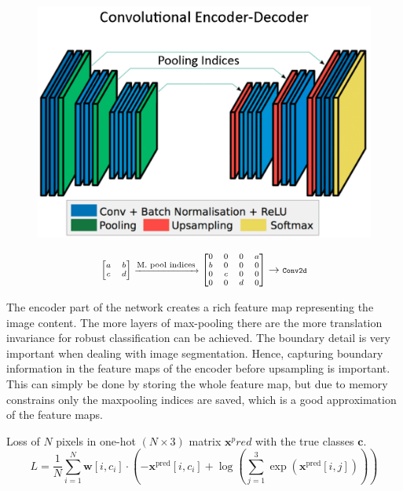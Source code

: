 \documentclass[
]{dtuposter}
\begin{document}
\begin{dtupostercontent}
\begin{figure}
	\begin{fadebox}\centering
	\includegraphics[width=0.8\linewidth]{Structure}
	\end{fadebox}
	\caption{}
	\label{fig:Structure}
\end{figure}
 
\begin{equation*}\label{key}
\scriptsize
\begin{bmatrix}a&b\\c&d\end{bmatrix} \xrightarrow{\text{\scriptsize M. pool indices}}
\begin{bmatrix}0&0&0&a\\b&0&0&0\\0&c&0&0\\0&0&d&0\end{bmatrix} 
\rightarrow 
\texttt{\scriptsize Conv2d}
\end{equation*}

The encoder part of the network creates a rich feature map representing the image content. The more 
layers of max-pooling there are the more translation invariance for robust 
classification can be achieved. The boundary detail is very important when 
dealing with image segmentation. Hence, capturing boundary information in 
the feature maps of the encoder before upsampling is important. This can 
simply be done by storing the whole feature map, but due to memory 
constrains only the maxpooling indices are saved, which is a good 
approximation of the feature maps. 


Loss of \(N\) pixels in one-hot \((N \times  3)\) matrix \(\mathbf x^pred\) with the true classes \(\mathbf c\).
\[
L = \frac 1 N \sum_{i=1}^{N} \mathbf{w}[i, c_i]  \cdot 
\left( 
-\mathbf x^\text{pred}[i, c_i] + \log
\left(
\sum_{j=1}^{3}\exp(\mathbf x^\text{pred}[i, j])
\right)
\right)
\]


\end{dtupostercontent}
\end{document}
